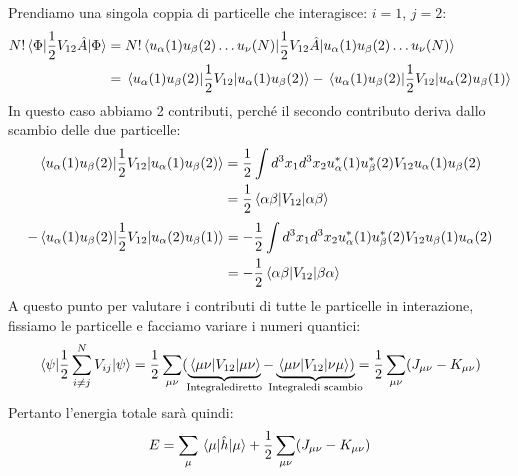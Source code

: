 Prendiamo una singola coppia di particelle che interagisce: $i=1$, $j=2$:
\begin{equation*}
    \begin{aligned}
    N!\mel{\Phi}{\frac12 V_{12}\hat A}{\Phi}
    & = N!\mel{u_\alpha(1)u_\beta(2)\dots u_\nu(N)}{\frac12 V_{12}\hat A}{u_\alpha(1)u_\beta(2)\dots u_\nu(N)} \\
    & = \mel{u_\alpha(1)u_\beta(2)}{\frac 12 V_{12}}{u_\alpha(1)u_\beta(2)}-\mel{u_\alpha(1)u_\beta(2)}{\frac 12 V_{12}}{u_\alpha(2)u_\beta(1)}
    \end{aligned}
\end{equation*}
In questo caso abbiamo 2 contributi, perché il secondo contributo deriva dallo scambio delle due particelle:
\begin{equation*}
    \begin{aligned}
    \mel{u_\alpha(1)u_\beta(2)}{\frac 12 V_{12}}{u_\alpha(1)u_\beta(2)}
    & = \frac 12 \int d^3x_1d^3x_2u_\alpha^*(1)u_\beta^*(2)V_{12}u_\alpha(1)u_\beta(2) \\
    & = \frac 12 \mel{\alpha\beta}{V_{12}}{\alpha\beta}
    \end{aligned}
\end{equation*}
\begin{equation*}
    \begin{aligned}
    -\mel{u_\alpha(1)u_\beta(2)}{\frac 12 V_{12}}{u_\alpha(2)u_\beta(1)}
    & = - \frac 12 \int d^3x_1d^3x_2u_\alpha^*(1)u_\beta^*(2)V_{12}u_\beta(1)u_\alpha(2) \\
    & = - \frac 12 \mel{\alpha\beta}{V_{12}}{\beta\alpha}
    \end{aligned}
\end{equation*}
A questo punto per valutare i contributi di tutte le particelle in interazione, fissiamo le particelle e facciamo variare i numeri quantici:
\begin{equation*}
    \mel{\psi}{\frac 12 \sum_{i\neq j}^NV_{ij}}{\psi}=\frac 12 \sum_{\mu\nu}(\underbrace{\mel{\mu\nu}{V_{12}}{\mu\nu}}_{\mathclap{\text{Integrale}\\ \text{diretto}}}-\underbrace{\mel{\mu\nu}{V_{12}}{\nu\mu})}_{\mathclap{\text{Integrale} \\ \text{di scambio}}}=\frac 12 \sum_{\mu\nu}(J_{\mu\nu}-K_{\mu\nu})
\end{equation*}
Pertanto l'energia totale sarà quindi:
\begin{equation*}
    E=\sum_\mu\mel{\mu}{\hat h}{\mu}+\frac 12\sum_{\mu\nu}(J_{\mu\nu}-K_{\mu\nu})
\end{equation*}
